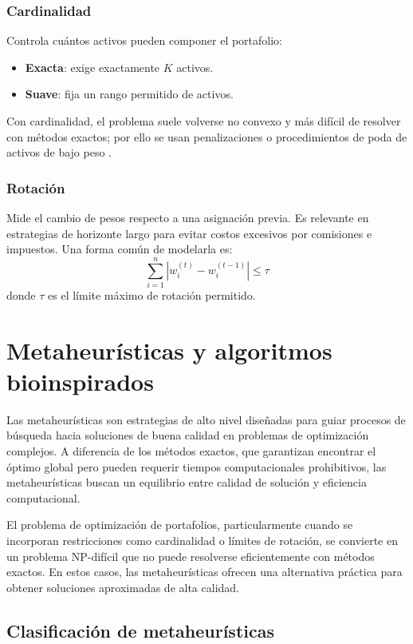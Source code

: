 \subsubsection{Cardinalidad}
Controla cuántos activos pueden componer
el portafolio:
\begin{itemize}
  \item \textbf{Exacta}: exige exactamente $K$ activos.
  \item \textbf{Suave}: fija un rango permitido de activos.
\end{itemize} Con cardinalidad, el problema suele volverse no convexo
y más difícil de resolver con métodos exactos; por ello se usan
penalizaciones o procedimientos de poda de activos de bajo peso
.
\subsubsection{Rotación}
Mide el cambio de pesos respecto a una
asignación previa. Es relevante en estrategias de horizonte largo
para evitar costos excesivos por comisiones e impuestos. Una forma
común de modelarla es:
\begin{equation}
  \sum_{i=1}^{n} |w_i^{(t)} - w_i^{(t-1)}| \le \tau
\end{equation}
donde $\tau$ es el límite máximo de rotación permitido.

\section{Metaheurísticas y algoritmos bioinspirados}

Las metaheurísticas son estrategias de alto nivel diseñadas para
guiar procesos de búsqueda hacia soluciones de buena calidad en
problemas de optimización complejos. A diferencia de los métodos
exactos, que garantizan encontrar el óptimo global pero pueden
requerir tiempos computacionales prohibitivos, las metaheurísticas
buscan un equilibrio entre calidad de solución y eficiencia
computacional.

El problema de optimización de portafolios, particularmente cuando se
incorporan restricciones como cardinalidad o límites de rotación,
se convierte en un problema NP-difícil que no puede resolverse
eficientemente con métodos exactos. En estos casos, las
metaheurísticas ofrecen una alternativa práctica para obtener
soluciones aproximadas de alta calidad.

\subsection{Clasificación de metaheurísticas}

